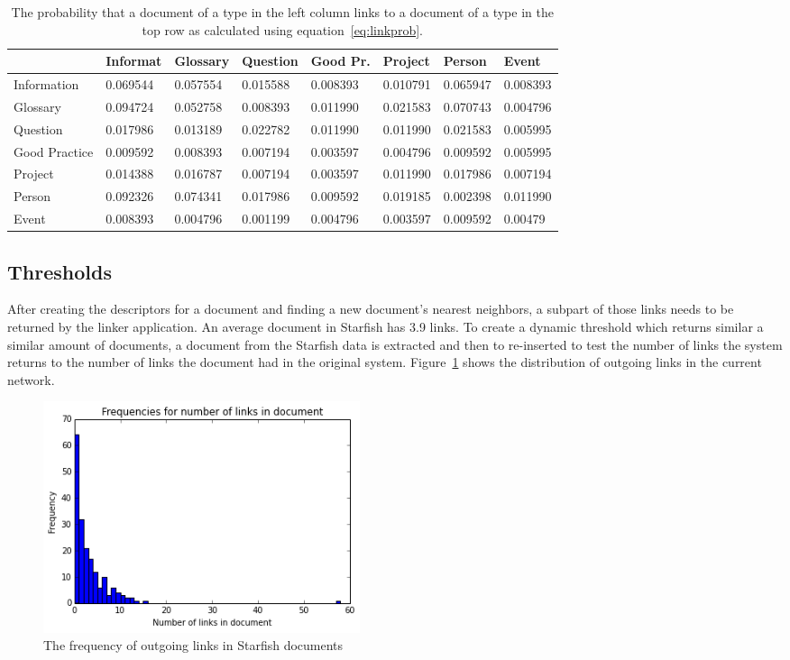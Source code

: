 \begin{table}[h!]
\center
\begin{tabular}{l | l l l l l l l}
 & Informat & Glossary & Question & Good Pr. & Project & Person &  Event \\ \hline
Information      & 0.069544 & 0.057554 & 0.015588 & 0.008393 & 0.010791 & 0.065947 & 0.008393\\
Glossary         & 0.094724 & 0.052758 & 0.008393 & 0.011990 & 0.021583 & 0.070743 & 0.004796\\
Question         & 0.017986 & 0.013189 & 0.022782 & 0.011990 & 0.011990 & 0.021583 & 0.005995\\
Good Practice    & 0.009592 & 0.008393 & 0.007194 & 0.003597 & 0.004796 & 0.009592 & 0.005995\\
Project          & 0.014388 & 0.016787 & 0.007194 & 0.003597 & 0.011990 & 0.017986 & 0.007194\\
Person           & 0.092326 & 0.074341 & 0.017986 & 0.009592 & 0.019185 & 0.002398 & 0.011990\\
Event            & 0.008393 & 0.004796 & 0.001199 & 0.004796 & 0.003597 & 0.009592 & 0.00479 
\end{tabular}
\caption{The probability that a document of a type in the left column links to a document of a type in the top row as calculated using equation~\ref{eq:linkprob}.}
\label{table:linkprob}
\end{table}

\subsection{Thresholds}
After creating the descriptors for a document and finding a new document's
nearest neighbors, a subpart of those links needs to be returned by the linker
application. An average document in Starfish has 3.9 links. To create a dynamic
threshold which returns similar a similar amount of documents, a document from
the Starfish data is extracted and then to re-inserted to test the number of
links the system returns to the number of links the document had in the
original system. Figure~\ref{fig:link_histogram} shows the distribution of
outgoing links in the current network.

\begin{figure}[h]
\centering
\includegraphics[width =0.45\textwidth]{images/link_histogram}
\caption{The frequency of outgoing links in Starfish documents}
\label{fig:link_histogram}
\end{figure}

